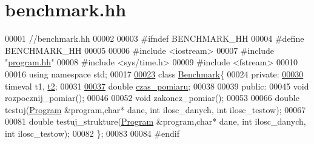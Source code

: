 \hypertarget{benchmark_8hh}{\section{benchmark.\-hh}
\label{benchmark_8hh}
}

\begin{DoxyCode}
00001 \textcolor{comment}{//benchmark.hh}
00002 
00003 \textcolor{preprocessor}{#ifndef BENCHMARK\_HH}
00004 \textcolor{preprocessor}{}\textcolor{preprocessor}{#define BENCHMARK\_HH}
00005 \textcolor{preprocessor}{}
00006 \textcolor{preprocessor}{#include <iostream>}
00007 \textcolor{preprocessor}{#include "\hyperlink{program_8hh}{program.hh}"}
00008 \textcolor{preprocessor}{#include <sys/time.h>}
00009 \textcolor{preprocessor}{#include <fstream>}
00010 
00016 \textcolor{keyword}{using namespace }std;
00017 
\hypertarget{benchmark_8hh_source_l00023}{}\hyperlink{class_benchmark}{00023} \textcolor{keyword}{class }\hyperlink{class_benchmark}{Benchmark}\{
00024 \textcolor{keyword}{private}:
\hypertarget{benchmark_8hh_source_l00030}{}\hyperlink{class_benchmark_a2b145dd2458fea33d6df41f310058bec}{00030}   timeval t1, \hyperlink{class_benchmark_a2b145dd2458fea33d6df41f310058bec}{t2};
00031 
\hypertarget{benchmark_8hh_source_l00037}{}\hyperlink{class_benchmark_ab72b3cbe324970fd8c738f03718d52fc}{00037}   \textcolor{keywordtype}{double} \hyperlink{class_benchmark_ab72b3cbe324970fd8c738f03718d52fc}{czas\_pomiaru};
00038 
00039 \textcolor{keyword}{public}:
00045   \textcolor{keywordtype}{void} rozpocznij\_pomiar();
00046 
00052   \textcolor{keywordtype}{void} zakoncz\_pomiar();
00053 
00066   \textcolor{keywordtype}{double} testuj(\hyperlink{class_program}{Program} &program,\textcolor{keywordtype}{char}* dane, \textcolor{keywordtype}{int} ilosc\_danych, \textcolor{keywordtype}{int} ilosc\_testow);
00067 
00081   \textcolor{keywordtype}{double} testuj\_strukture(\hyperlink{class_program}{Program} &program,\textcolor{keywordtype}{char}* dane, \textcolor{keywordtype}{int} ilosc\_danych, \textcolor{keywordtype}{int} ilosc\_testow);
00082 \};
00083 
00084 \textcolor{preprocessor}{#endif}
\end{DoxyCode}
